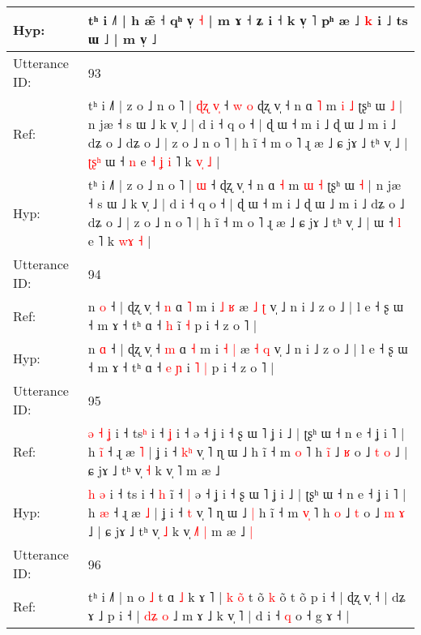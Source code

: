 \documentclass[10pt]{article}
\DeclareRobustCommand{\hl}[1]{{\textcolor{red}{#1}}}
\begin{document}
\begin{longtable}{ll}
 \\
Hyp: & tʰ i ˩˥ | h æ̃ ˧ qʰ v̩ \hl{˧} | m ɤ ˧ ʑ i ˧ k v̩ ˥ pʰ æ ˩ \hl{k} i ˩ ts ɯ ˩ | m v̩ ˩
 \\
\midrule
Utterance ID: & 93 \\
Ref: & tʰ i ˩˥ | z o ˩ n o ˥ |\hl{ }\hl{ɖ}\hl{ʐ} \hl{v}\hl{̩} ˧\hl{ }\hl{w}\hl{ }\hl{o} ɖʐ v̩ ˧ n ɑ \hl{˥} m \hl{i} \hl{˩} ʈʂʰ ɯ \hl{˩} | n jæ ˧ s ɯ ˩ k v̩ ˩ | d i ˧ q o ˧ | ɖ ɯ ˧ m i ˩ ɖ ɯ ˩ m i ˩ dʑ o ˩ dʑ o ˩ | z o ˩ n o ˥ | h ĩ ˧ m o ˥ ɻ æ ˩ ɕ jɤ ˩ tʰ v̩ ˩ |\hl{ }\hl{ʈ}\hl{ʂ}\hl{ʰ} ɯ ˧ \hl{n} e\hl{ }\hl{˧}\hl{ }\hl{ʝ}\hl{ }\hl{i} ˥ k \hl{v}\hl{̩} \hl{˩} |
 \\
Hyp: & tʰ i ˩˥ | z o ˩ n o ˥ |\hl{}\hl{}\hl{} \hl{}\hl{ɯ} ˧\hl{}\hl{}\hl{}\hl{} ɖʐ v̩ ˧ n ɑ \hl{˧} m \hl{ɯ} \hl{˧} ʈʂʰ ɯ \hl{˧} | n jæ ˧ s ɯ ˩ k v̩ ˩ | d i ˧ q o ˧ | ɖ ɯ ˧ m i ˩ ɖ ɯ ˩ m i ˩ dʑ o ˩ dʑ o ˩ | z o ˩ n o ˥ | h ĩ ˧ m o ˥ ɻ æ ˩ ɕ jɤ ˩ tʰ v̩ ˩ |\hl{}\hl{}\hl{}\hl{} ɯ ˧ \hl{l} e\hl{}\hl{}\hl{}\hl{}\hl{}\hl{} ˥ k \hl{w}\hl{ɤ} \hl{˧} |
 \\
\midrule
Utterance ID: & 94 \\
Ref: & n \hl{o} ˧ | ɖʐ v̩ ˧ \hl{n} ɑ \hl{˥} m i \hl{˩} \hl{ʁ} æ \hl{˩} \hl{ʈ} v̩ ˩ n i ˩ z o ˩ | l e ˧ ʂ ɯ ˧ m ɤ ˧ tʰ ɑ ˧\hl{}\hl{} \hl{h} i\hl{}\hl{̃} \hl{˧} p i ˧ z o ˥ |
 \\
Hyp: & n \hl{ɑ} ˧ | ɖʐ v̩ ˧ \hl{m} ɑ \hl{˧} m i \hl{˧} \hl{|} æ \hl{˧} \hl{q} v̩ ˩ n i ˩ z o ˩ | l e ˧ ʂ ɯ ˧ m ɤ ˧ tʰ ɑ ˧\hl{ }\hl{e} \hl{ɲ} i\hl{ }\hl{˥} \hl{|} p i ˧ z o ˥ |
 \\
\midrule
Utterance ID: & 95 \\
Ref: & \hl{ə}\hl{ }\hl{˧} \hl{ʝ} i ˧ ts\hl{ʰ} i ˧ \hl{ʝ} i\hl{} ˧\hl{}\hl{} ə ˧ ʝ i ˧ ʂ ɯ ˥ ʝ i ˩ | ʈʂʰ ɯ ˧ n e ˧ ʝ i ˥ | h \hl{i}\hl{̃} ˧ ɻ æ \hl{˥} | ʝ i ˧ \hl{k}\hl{ʰ} v̩ ˥ ɳ ɯ ˩\hl{}\hl{} h ĩ ˧ m \hl{}\hl{o} ˥ h \hl{i}\hl{̃} ˩ \hl{ʁ} o ˩ \hl{t} \hl{o} ˩ | ɕ jɤ ˩ tʰ v̩ \hl{˧} k v̩ \hl{}˥\hl{}\hl{} m æ ˩\hl{}\hl{}
 \\
Hyp: & \hl{}\hl{}\hl{h} \hl{ə} i ˧ ts\hl{} i ˧ \hl{h} i\hl{̃} ˧\hl{ }\hl{|} ə ˧ ʝ i ˧ ʂ ɯ ˥ ʝ i ˩ | ʈʂʰ ɯ ˧ n e ˧ ʝ i ˥ | h \hl{}\hl{æ} ˧ ɻ æ \hl{˩} | ʝ i ˧ \hl{}\hl{t} v̩ ˥ ɳ ɯ ˩\hl{ }\hl{|} h ĩ ˧ m \hl{v}\hl{̩} ˥ h \hl{}\hl{o} ˩ \hl{t} o ˩ \hl{m} \hl{ɤ} ˩ | ɕ jɤ ˩ tʰ v̩ \hl{˩} k v̩ \hl{˩}˥\hl{ }\hl{|} m æ ˩\hl{ }\hl{|}
 \\
\midrule
Utterance ID: & 96 \\
Ref: & tʰ i ˩˥ | n o \hl{˩} t ɑ \hl{˩} k ɤ ˥ | \hl{k} \hl{o}\hl{̃} t o\hl{}\hl{}\hl{}\hl{̃} \hl{k} o\hl{}\hl{̃} t o\hl{}\hl{̃} p i ˧ | ɖʐ v̩ ˧ | dʑ ɤ ˩ p i ˧ | \hl{d}\hl{ʑ} \hl{o} ˩ m ɤ ˩ k v̩ \hl{}˥ | d i ˧ \hl{q} o ˧ g ɤ ˧ |

\end{longtable}
\end{document}
